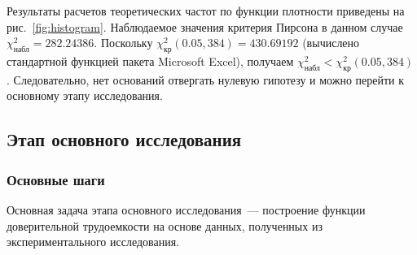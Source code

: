 \documentclass[a4paper, article, 14pt]{extarticle}
\begin{document}
Результаты расчетов теоретических частот по функции плотности приведены на рис.~\ref{fig:histogram}. Наблюдаемое значения критерия Пирсона в данном случае $\chi_{\text{набл}}^2 = 282.24386$. Поскольку $\chi_{\text{кр}}^2(0.05, 384) = 430.69192$ (вычислено стандартной функцией пакета Microsoft Excel), получаем $\chi_{\text{набл}}^2 < \chi_{\text{кр}}^2(0.05, 384)$. Следовательно, нет оснований отвергать нулевую гипотезу и можно перейти к основному этапу исследования.

\subsection{Этап основного исследования}\label{sec:analysis_part_2}

\subsubsection{Основные шаги}\label{subsec:analysis_part_2_intro}

Основная задача этапа основного исследования~--- построение функции доверительной трудоемкости на основе данных, полученных из экспериментального исследования.
\end{document}

